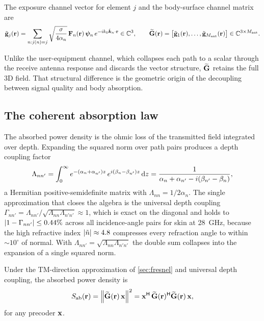 \begin{definition}\label{def:Gtil}
The exposure channel vector for element $j$ and the body-surface channel
matrix are
\begin{equation}\label{eq:Gtil}
  \tilde{\mathbf g}_j(\mathbf{r})=\sum_{n:j(n)=j}\sqrt{\frac{\sigma}{4\alpha_n}}\,
    \mathbf{F}_n(\mathbf{r})\,\bm{\psi}_n\,e^{-ik_0\hat{\bm{k}}_n\cdot\mathbf{r}}\in\mathbb{C}^3,
  \qquad
  \widetilde{\mathbf{G}}(\mathbf{r})=\bigl[\tilde{\mathbf g}_1(\mathbf{r}),\ldots,
                   \tilde{\mathbf g}_{M_{\mathrm{ant}}}(\mathbf{r})\bigr]
            \in\mathbb{C}^{3\times M_{\mathrm{ant}}}.
\end{equation}
\end{definition}

Unlike the user-equipment channel, which collapses each path to a scalar
through the receive antenna response and discards the vector structure,
$\widetilde{\mathbf{G}}$ retains the full 3D field. That structural difference is the
geometric origin of the decoupling between signal quality and body
absorption.

\subsection{The coherent absorption law}

The absorbed power density is the ohmic loss of the transmitted field
integrated over depth. Expanding the squared norm over path pairs
produces a depth coupling factor
\begin{equation}\label{eq:Lambda}
  \Lambda_{nn'}=\int_0^\infty
    e^{-(\alpha_n+\alpha_{n'})z}\,e^{i(\beta_n-\beta_{n'})z}\,\mathrm{d} z
   =\frac{1}{\alpha_n+\alpha_{n'}-i(\beta_{n'}-\beta_n)},
\end{equation}
a Hermitian positive-semidefinite matrix with $\Lambda_{nn}=1/2\alpha_n$.
The single approximation that closes the algebra is the universal depth
coupling
$\Gamma_{nn'}=\Lambda_{nn'}/\sqrt{\Lambda_{nn}\Lambda_{n'n'}}\approx 1$,
which is exact on the diagonal and holds to $\abs{1-\Gamma_{nn'}}\le 0.44\%$
across all incidence-angle pairs for skin at \SI{28}{\giga\hertz},
because the high refractive index $\abs{\tilde{n}}\approx 4.8$ compresses
every refraction angle to within $\sim\!10^\circ$ of normal. With
$\Lambda_{nn'}=\sqrt{\Lambda_{nn}\Lambda_{n'n'}}$ the double sum
collapses into the expansion of a single squared norm.

\begin{theorem}\label{thm:coherent-law}
Under the TM-direction approximation of \cref{sec:fresnel} and universal
depth coupling, the absorbed power density is
\begin{equation}\label{eq:coherent-law}
  S_{\mathrm{ab}}(\mathbf{r})=\norm{\widetilde{\mathbf{G}}(\mathbf{r})\,\mathbf{x}}^2
           =\mathbf{x}^{\mathsf{H}}\,\widetilde{\mathbf{G}}(\mathbf{r})^{\mathsf{H}}\widetilde{\mathbf{G}}(\mathbf{r})\,\mathbf{x},
\end{equation}
for any precoder $\mathbf{x}$.
\end{theorem}

